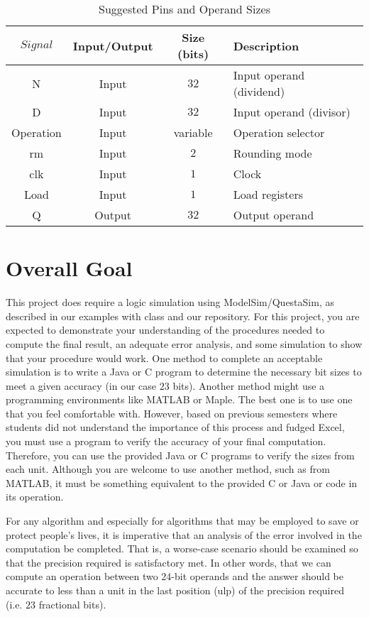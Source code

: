 \documentclass[times, 10pt, twocolumn]{IEEEtran}
\begin{document}
\begin{table*} [ht!]
  \centering
  \begin{tabular}{|c|c|c|l|} \hline
    $Signal$ & Input/Output & Size (bits) & Description \\ \hline \hline
    N         & Input  & $32$     & Input operand (dividend) \\ \hline
    D         & Input  & $32$     & Input operand (divisor) \\ \hline
    Operation & Input  & variable & Operation selector \\ \hline
    rm        & Input  & $2$      & Rounding mode \\ \hline
    clk       & Input  & $1$      & Clock  \\ \hline
    Load      & Input  & $1$      & Load registers \\ \hline
    Q         & Output & $32$     & Output operand \\ \hline
  \end{tabular}
  \caption{Suggested Pins and Operand Sizes}
  \label{table1.tbl}
\end{table*}

\section{Overall Goal}

This project does require a logic simulation using
ModelSim/QuestaSim, as described
in our examples with class and our repository.
For this project, you are expected to demonstrate your
understanding of the
procedures needed to compute the final result, an adequate error analysis,
and some simulation to show that your procedure would work.  One method to
complete an acceptable 
simulation is to write a Java or C program to determine the necessary
bit sizes to meet a given accuracy (in our case $23$ bits).  Another
method might use a
programming environments like MATLAB or Maple.  The best one is to use one that
you feel comfortable with.  However, based on previous semesters where
students did not understand the importance of this process and fudged
Excel, you must
use a program to verify the accuracy of your final computation.
Therefore, you can use the provided Java or C programs to verify the
sizes from each unit.  Although you are welcome to use another method,
such as from MATLAB, it must be something equivalent to the provided C
or Java or code in its operation.

For any algorithm and especially for algorithms that may be employed
to save or protect
people's lives, it is imperative that an
analysis of the error involved in the computation be completed.  That is,
a worse-case scenario should be examined so that the precision required is
satisfactory met.  In other words, that we can compute an operation between
two $24$-bit operands and the answer should be accurate to less than a unit
in the last position (ulp) of the precision required (i.e. $23$ fractional bits).
\end{document}

